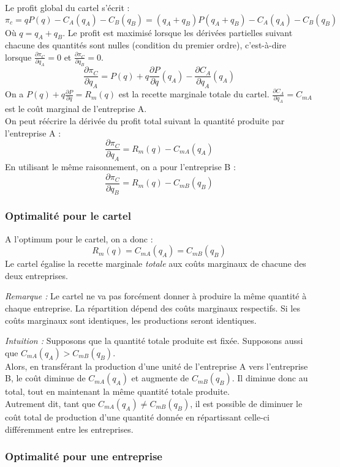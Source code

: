 \documentclass[
]{book}
\theoremstyle{definition}
\theoremstyle{definition}
\theoremstyle{definition}
\theoremstyle{definition}
\theoremstyle{remark}
\begin{document}
Le profit global du cartel s'écrit :
\[
\pi_c=qP(q)-C_A(q_A)-C_B(q_B)=(q_A+q_B)P(q_A+q_B)-C_A(q_A)-C_B(q_B)
\]
Où \(q=q_A+q_B\).
Le profit est maximisé lorsque les dérivées partielles suivant chacune des quantités sont nulles (condition du premier ordre), c'est-à-dire lorsque \(\frac{\partial\pi_C}{\partial q_A}=0\) et \(\frac{\partial\pi_C}{\partial q_B}=0\).
\[
\frac{\partial\pi_C}{\partial q_A} = P(q) + q\frac{\partial P}{\partial q}(q_A)-\frac{\partial C_A}{\partial q_A}(q_A)
\]
On a \(P(q) + q\frac{\partial P}{\partial q}=R_m(q)\) est la recette marginale totale du cartel.
\(\frac{\partial C_A}{\partial q_A}=C_{mA}\) est le coût marginal de l'entreprise A.\\
On peut réécrire la dérivée du profit total suivant la quantité produite par l'entreprise A :
\[
\frac{\partial\pi_C}{\partial q_A} = R_m(q)  - C_{mA}(q_A)
\]
En utilisant le même raisonnement, on a pour l'entreprise B :
\[
\frac{\partial\pi_C}{\partial q_B} = R_m(q)  - C_{mB}(q_B)
\]

\hypertarget{optimalituxe9-pour-le-cartel}{%
\subsubsection{Optimalité pour le cartel}\label{optimalituxe9-pour-le-cartel}}

A l'optimum pour le cartel, on a donc :
\[R_m(q) = C_{mA}(q_A) = C_{mB}(q_B)\]
Le cartel égalise la recette marginale \emph{totale} aux coûts marginaux de chacune des deux entreprises.

\emph{Remarque :} Le cartel ne va pas forcément donner à produire la même quantité à chaque entreprise.
La répartition dépend des coûts marginaux respectifs.
Si les coûts marginaux sont identiques, les productions seront identiques.

\emph{Intuition :} Supposons que la quantité totale produite est fixée.
Supposons aussi que \(C_{mA}(q_A)>C_{mB}(q_B)\).\\
Alors, en transférant la production d'une unité de l'entreprise A vers l'entreprise B, le coût diminue de \(C_{mA}(q_A)\) et augmente de \(C_{mB}(q_B)\).
Il diminue donc au total, tout en maintenant la même quantité totale produite.\\
Autrement dit, tant que \(C_{mA}(q_A)\neq C_{mB}(q_B)\), il est possible de diminuer le coût total de production d'une quantité donnée en répartissant celle-ci différemment entre les entreprises.

\hypertarget{optimalituxe9-pour-une-entreprise}{%
\subsubsection{Optimalité pour une entreprise}\label{optimalituxe9-pour-une-entreprise}}
\end{document}
